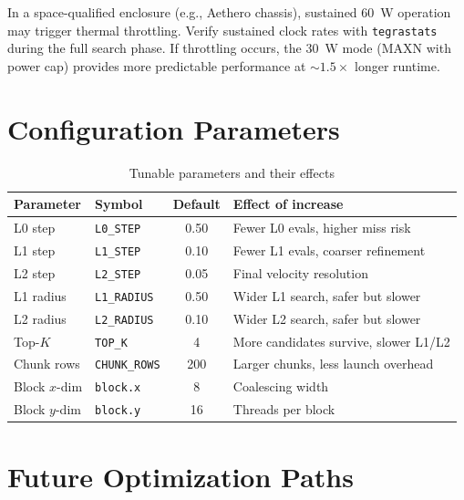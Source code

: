 \documentclass[11pt,letterpaper]{article}
\begin{document}
\begin{warnbox}
In a space-qualified enclosure (e.g., Aethero chassis), sustained 60~W
operation may trigger thermal throttling. Verify sustained clock rates
with \texttt{tegrastats} during the full search phase. If throttling
occurs, the 30~W mode (MAXN with power cap) provides more predictable
performance at ${\sim}1.5\times$ longer runtime.
\end{warnbox}

\section{Configuration Parameters}
\label{sec:config}

\begin{table}[h]
\centering
\caption{Tunable parameters and their effects}
\label{tab:params}
\begin{tabular}{llcl}
\toprule
\textbf{Parameter} & \textbf{Symbol} & \textbf{Default} & \textbf{Effect of increase} \\
\midrule
L0 step           & \texttt{L0\_STEP}    & 0.50  & Fewer L0 evals, higher miss risk \\
L1 step           & \texttt{L1\_STEP}    & 0.10  & Fewer L1 evals, coarser refinement \\
L2 step           & \texttt{L2\_STEP}    & 0.05  & Final velocity resolution \\
L1 radius         & \texttt{L1\_RADIUS}  & 0.50  & Wider L1 search, safer but slower \\
L2 radius         & \texttt{L2\_RADIUS}  & 0.10  & Wider L2 search, safer but slower \\
Top-$K$           & \texttt{TOP\_K}      & 4     & More candidates survive, slower L1/L2 \\
Chunk rows        & \texttt{CHUNK\_ROWS} & 200   & Larger chunks, less launch overhead \\
Block $x$-dim     & \texttt{block.x}     & 8     & Coalescing width \\
Block $y$-dim     & \texttt{block.y}     & 16    & Threads per block \\
\bottomrule
\end{tabular}
\end{table}


\section{Future Optimization Paths}
\label{sec:future}
\end{document}
